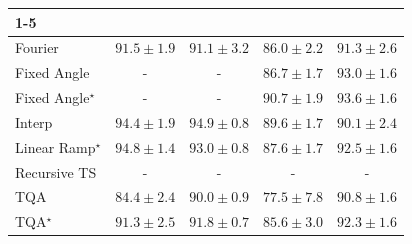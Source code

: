 \begin{tabular}{l|cccc|}
\cline{1-5}
\multicolumn{5}{c}{\rule{0pt}{8pt}PP} \\
\midrule
Fourier & {\cellcolor[HTML]{3AA257}} \color[HTML]{F1F1F1} $91.5\pm 1.9$ & {\cellcolor[HTML]{3FA85B}} \color[HTML]{F1F1F1} $91.1\pm 3.2$ & {\cellcolor[HTML]{A4D98A}} \color[HTML]{000000} $86.0\pm 2.2$ & {\cellcolor[HTML]{3DA559}} \color[HTML]{F1F1F1} $91.3\pm 2.6$ \\
Fixed Angle & {\cellcolor[HTML]{000000}} \color[HTML]{F1F1F1} {\cellcolor{white}} \color{black} - & {\cellcolor[HTML]{000000}} \color[HTML]{F1F1F1} {\cellcolor{white}} \color{black} - & {\cellcolor[HTML]{95D385}} \color[HTML]{000000} $86.7\pm 1.7$ & {\cellcolor[HTML]{2A8D49}} \color[HTML]{F1F1F1} $93.0\pm 1.6$ \\
Fixed Angle$^\star$ & {\cellcolor[HTML]{000000}} \color[HTML]{F1F1F1} {\cellcolor{white}} \color{black} - & {\cellcolor[HTML]{000000}} \color[HTML]{F1F1F1} {\cellcolor{white}} \color{black} - & {\cellcolor[HTML]{45AD5F}} \color[HTML]{F1F1F1} $90.7\pm 1.9$ & {\cellcolor[HTML]{238443}} \color[HTML]{F1F1F1} $93.6\pm 1.6$ \\
Interp & {\cellcolor[HTML]{187B3F}} \color[HTML]{F1F1F1} $94.4\pm 1.9$ & {\cellcolor[HTML]{12763D}} \color[HTML]{F1F1F1} $94.9\pm 0.8$ & {\cellcolor[HTML]{5CB86B}} \color[HTML]{F1F1F1} $89.6\pm 1.7$ & {\cellcolor[HTML]{51B365}} \color[HTML]{F1F1F1} $90.1\pm 2.4$ \\
Linear Ramp$^\star$ & {\cellcolor[HTML]{13773D}} \color[HTML]{F1F1F1} $94.8\pm 1.4$ & {\cellcolor[HTML]{2A8D49}} \color[HTML]{F1F1F1} $93.0\pm 0.8$ & {\cellcolor[HTML]{84CB7E}} \color[HTML]{000000} $87.6\pm 1.7$ & {\cellcolor[HTML]{2F944E}} \color[HTML]{F1F1F1} $92.5\pm 1.6$ \\
Recursive TS & {\cellcolor[HTML]{000000}} \color[HTML]{F1F1F1} {\cellcolor{white}} \color{black} - & {\cellcolor[HTML]{000000}} \color[HTML]{F1F1F1} {\cellcolor{white}} \color{black} - & {\cellcolor[HTML]{000000}} \color[HTML]{F1F1F1} {\cellcolor{white}} \color{black} - & {\cellcolor[HTML]{000000}} \color[HTML]{F1F1F1} {\cellcolor{white}} \color{black} - \\
TQA & {\cellcolor[HTML]{C0E597}} \color[HTML]{000000} $84.4\pm 2.4$ & {\cellcolor[HTML]{53B466}} \color[HTML]{F1F1F1} $90.0\pm 0.9$ & {\cellcolor[HTML]{FFFFE4}} \color[HTML]{000000} $77.5\pm 7.8$ & {\cellcolor[HTML]{43AC5E}} \color[HTML]{F1F1F1} $90.8\pm 1.6$ \\
TQA$^\star$ & {\cellcolor[HTML]{3DA559}} \color[HTML]{F1F1F1} $91.3\pm 2.5$ & {\cellcolor[HTML]{379E54}} \color[HTML]{F1F1F1} $91.8\pm 0.7$ & {\cellcolor[HTML]{ABDC8D}} \color[HTML]{000000} $85.6\pm 3.0$ & {\cellcolor[HTML]{31974F}} \color[HTML]{F1F1F1} $92.3\pm 1.6$ \\

\end{tabular}

